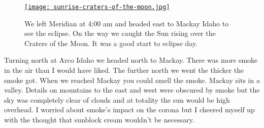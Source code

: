 

\begin{SCfigure}
\centering
\href{https://conceptcontrol.smugmug.com/Places/USA-and-Canada/Idaho-Instants/i-mXNChFm/A}{\texttt{[image: sunrise-craters-of-the-moon.jpg]}}
\caption[We left Meridian at 4:00 am and headed east to Mackay Idaho to see the
eclipse.]{We left Meridian at 4:00 am and headed east to Mackay Idaho to see the
eclipse. On the way we caught the Sun rising over the Craters of the
Moon. It was a good start to eclipse day.}
\label{fig:5430x1}
\end{SCfigure}


Turning north at Arco Idaho we headed north to Mackay. There was more
smoke in the air than I would have liked. The further north we went the
thicker the smoke got. When we reached Mackay you could smell the smoke.
Mackay sits in a valley. Details on mountains to the east and west were
obscured by smoke but the sky was completely clear of clouds and at
totality the sun would be high overhead. I worried about smoke's impact
on the corona but I cheered myself up with the thought that sunblock
cream wouldn't be necessary.



